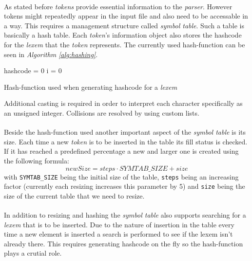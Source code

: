 	\paragraph{}
		As stated before \textit{tokens} provide essential information to the \textit{parser}. However tokens might repeatedly appear in the input file and also need to be accessable in a way. This requires a management structure called \textit{symbol table}. Such a table is basically a hash table. Each \textit{token}'s information object also stores the hashcode for the \textit{lexem} that the \textit{token} represents. The currently used hash-function can be seen in \textit{Algorithm \ref{alg:hashing}}.\\
		\begin{algorithm}[H]
 			hashcode = 0\;
 			i = 0\;
 			\label{alg:hashing}
 			\caption{Hash-function used when generating hashcode for a \textit{lexem}}
		\end{algorithm}
		Additional casting is required in order to interpret each character specifically as an unsigned integer. Collisions are resolved by using custom lists.
		
	\paragraph{}
		Beside the hash-function used another important aspect of the \textit{symbol table} is its size. Each time a new \textit{token} is to be inserted in the table its fill status is checked. If it has reached a predefined percentage a new and larger one is created using the following formula:
		\begin{equation}
		  newSize = steps \cdot SYMTAB\_SIZE + size
		\end{equation}
		with \texttt{SYMTAB\_SIZE} being the initial size of the table, \texttt{steps} being an increasing factor (currently each resizing increases this parameter by 5) and \texttt{size} being the size of the current table that we need to resize.
	\paragraph{}
		In addition to resizing and hashing the \textit{symbol table} also supports searching for a \textit{lexem} that is to be inserted. Due to the nature of insertion in the table every time a new element is inserted a search is performed to see if the lexem isn't already there. This requires generating hashcode on the fly so the hash-function plays a crutial role.
